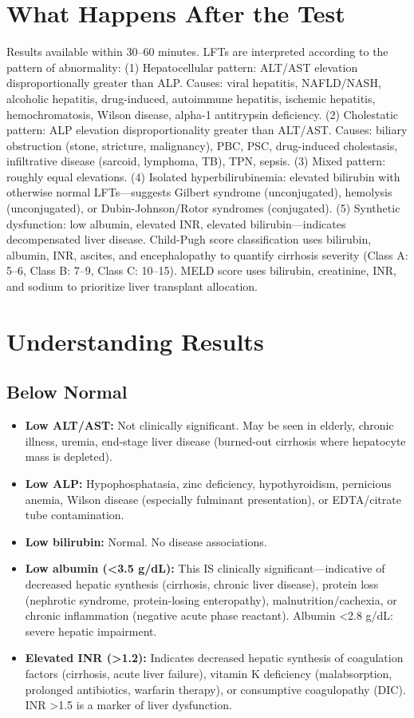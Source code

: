 \section*{What Happens After the Test}
Results available within 30--60 minutes. LFTs are interpreted according to the pattern of abnormality: (1) Hepatocellular pattern: ALT/AST elevation disproportionally greater than ALP. Causes: viral hepatitis, NAFLD/NASH, alcoholic hepatitis, drug-induced, autoimmune hepatitis, ischemic hepatitis, hemochromatosis, Wilson disease, alpha-1 antitrypsin deficiency. (2) Cholestatic pattern: ALP elevation disproportionality greater than ALT/AST. Causes: biliary obstruction (stone, stricture, malignancy), PBC, PSC, drug-induced cholestasis, infiltrative disease (sarcoid, lymphoma, TB), TPN, sepsis. (3) Mixed pattern: roughly equal elevations. (4) Isolated hyperbilirubinemia: elevated bilirubin with otherwise normal LFTs---suggests Gilbert syndrome (unconjugated), hemolysis (unconjugated), or Dubin-Johnson/Rotor syndromes (conjugated). (5) Synthetic dysfunction: low albumin, elevated INR, elevated bilirubin---indicates decompensated liver disease. Child-Pugh score classification uses bilirubin, albumin, INR, ascites, and encephalopathy to quantify cirrhosis severity (Class A: 5--6, Class B: 7--9, Class C: 10--15). MELD score uses bilirubin, creatinine, INR, and sodium to prioritize liver transplant allocation.

\section*{Understanding Results}

\subsection*{Below Normal}
\begin{itemize}
  \item \textbf{Low ALT/AST:} Not clinically significant. May be seen in elderly, chronic illness, uremia, end-stage liver disease (burned-out cirrhosis where hepatocyte mass is depleted).
  \item \textbf{Low ALP:} Hypophosphatasia, zinc deficiency, hypothyroidism, pernicious anemia, Wilson disease (especially fulminant presentation), or EDTA/citrate tube contamination.
  \item \textbf{Low bilirubin:} Normal. No disease associations.
  \item \textbf{Low albumin (<3.5 g/dL):} This IS clinically significant---indicative of decreased hepatic synthesis (cirrhosis, chronic liver disease), protein loss (nephrotic syndrome, protein-losing enteropathy), malnutrition/cachexia, or chronic inflammation (negative acute phase reactant). Albumin <2.8 g/dL: severe hepatic impairment.
  \item \textbf{Elevated INR (>1.2):} Indicates decreased hepatic synthesis of coagulation factors (cirrhosis, acute liver failure), vitamin K deficiency (malabsorption, prolonged antibiotics, warfarin therapy), or consumptive coagulopathy (DIC). INR >1.5 is a marker of liver dysfunction.
\end{itemize}

